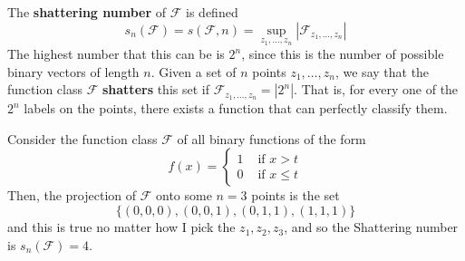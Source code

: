 \documentclass{article}
\begin{document}
  \begin{definition}
    The \textbf{shattering number} of $\mathcal{F}$ is defined 
    \begin{equation}
      s_n (\mathcal{F}) = s(\mathcal{F}, n) = \sup_{z_1, \ldots, z_n} |\mathcal{F}_{z_1, \ldots, z_n}|
    \end{equation}
    The highest number that this can be is $2^n$, since this is the number of possible binary vectors of length $n$. Given a set of $n$ points $z_1, \ldots, z_n$, we say that the function class $\mathcal{F}$ \textbf{shatters} this set if $\mathcal{F}_{z_1, \ldots, z_n} = |2^n|$. That is, for every one of the $2^n$ labels on the points, there exists a function that can perfectly classify them. 
  \end{definition}

  \begin{example}
    Consider the function class $\mathcal{F}$ of all binary functions of the form 
    \begin{equation}
      f(x) = \begin{cases} 1 & \text{ if } x > t \\
        0 & \text{ if } x \leq t \end{cases} 
    \end{equation}
    Then, the projection of $\mathcal{F}$ onto some $n = 3$ points is the set 
    \begin{equation}
      \{ (0, 0, 0), (0, 0, 1), (0, 1, 1), (1, 1, 1) \}
    \end{equation}
    and this is true no matter how I pick the $z_1, z_2, z_3$, and so the Shattering number is $s_n (\mathcal{F}) = 4$. 
  \end{example}
\end{document}
